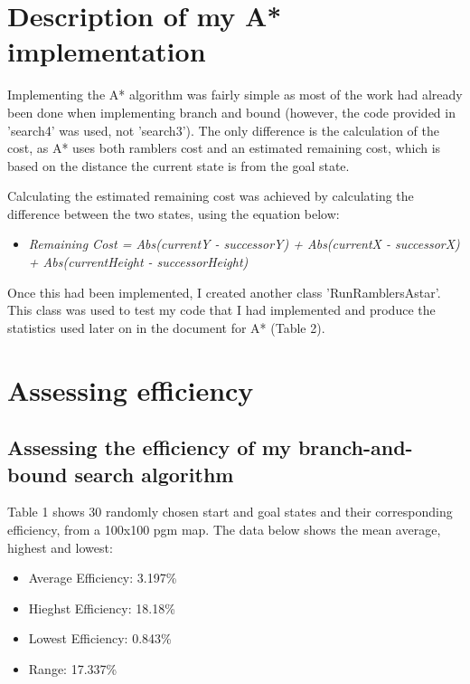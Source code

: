 \documentclass[11pt,oneside]{article}
\begin{document}
\break
\section{Description of my A* implementation}
Implementing the A* algorithm was fairly simple as most of the work had already been done when implementing branch and bound (however, the code provided in 'search4' was used, not 'search3'). The only difference is the calculation of the cost, as A* uses both ramblers cost and an estimated remaining cost, which is based on the distance the current state is from the goal state.

Calculating the estimated remaining cost was achieved by calculating the difference between the two states, using the equation below:
\begin{itemize}
    \item \textit{Remaining Cost = Abs(currentY - successorY) + Abs(currentX - successorX) + Abs(currentHeight - successorHeight)}
\end{itemize}

Once this had been implemented, I created another class 'RunRamblersAstar'. This class was used to test my code that I had implemented and produce the statistics used later on in the document for A* (Table 2).

\break
\section{Assessing efficiency}
 \subsection{Assessing the efficiency of my branch-and-bound search algorithm}
Table 1 shows 30 randomly chosen start and goal states and their corresponding efficiency, from a 100x100 pgm map. The data below shows the mean average, highest and lowest:
\begin{itemize}
	\item Average Efficiency:	3.197\%
	\item Hieghst Efficiency:	18.18\%
	\item Lowest Efficiency:	0.843\%
	\item Range:	17.337\%
\end{itemize}
\end{document}
